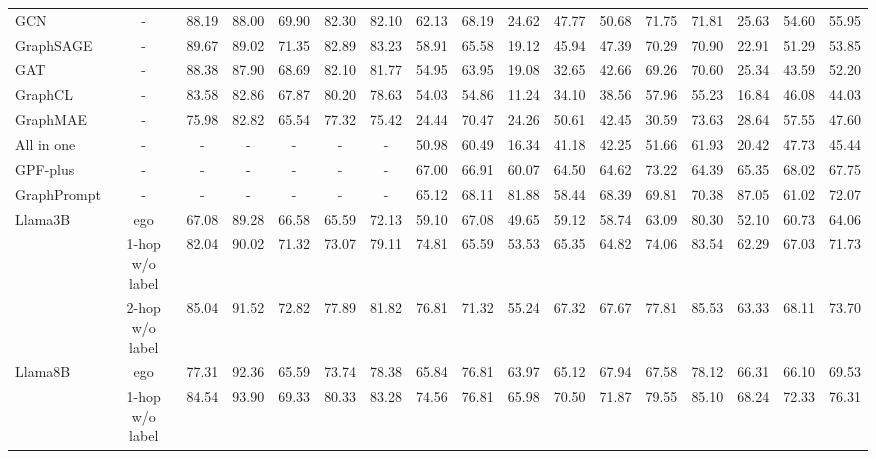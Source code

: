 \begin{table*}[htbp]
{\begin{tabular}{l c c c c c c | c c c c c | c c c c c}
GCN &- & 88.19 & 88.00 & 69.90 & 82.30 \cellcolor{cyan!20} & 82.10 & 62.13 & 68.19 & 24.62 & 47.77 & 50.68 & 71.75 & 71.81 & 25.63 & 54.60 & 55.95 \\
GraphSAGE &- & 89.67 \cellcolor{cyan!100} & 89.02 & 71.35  \cellcolor{cyan!20} & 82.89 \cellcolor{cyan!50} & 83.23 \cellcolor{cyan!20} & 58.91 & 65.58 & 19.12 & 45.94 & 47.39 & 70.29 & 70.90 & 22.91 & 51.29 & 53.85 \\
GAT &- & 88.38 \cellcolor{cyan!20} & 87.90 & 68.69 & 82.10 & 81.77 & 54.95 & 63.95 & 19.08 & 32.65 & 42.66 & 69.26 & 70.60 & 25.34 & 43.59 & 52.20 \\
GraphCL &- & 83.58 & 82.86 & 67.87 & 80.20 & 78.63 & 54.03 & 54.86 & 11.24 & 34.10 & 38.56 & 57.96 & 55.23 & 16.84 & 46.08 & 44.03 \\
GraphMAE &- & 75.98 & 82.82 & 65.54 & 77.32 & 75.42 & 24.44 & 70.47 & 24.26 & 50.61 & 42.45 & 30.59 & 73.63 & 28.64 & 57.55 & 47.60 \\
All in one &- &- &- &- &- &- & 50.98 & 60.49 & 16.34 & 41.18 & 42.25 & 51.66 & 61.93 & 20.42 & 47.73 & 45.44 \\
GPF-plus &- &- &- &- &- &- & 67.00 & 66.91 & 60.07 & 64.50 & 64.62 & 73.22 & 64.39 & 65.35 & 68.02 & 67.75 \\
GraphPrompt &- &- &- &- &- &- & 65.12 & 68.11 & 81.88 \cellcolor{cyan!100} & 58.44 & 68.39 \cellcolor{cyan!20} & 69.81 & 70.38 & 87.05 \cellcolor{cyan!100} & 61.02 & 72.07 \\
\midrule
\multirow{3}{*}{Llama3B} & ego & 67.08 & 89.28 & 66.58 & 65.59 & 72.13 & 59.10 & 67.08 & 49.65 & 59.12 & 58.74 & 63.09 & 80.30 & 52.10 & 60.73 & 64.06 \\
& 1-hop w/o label & 82.04 & 90.02 & 71.32 & 73.07 & 79.11 & 74.81 \cellcolor{cyan!20} & 65.59 & 53.53 & 65.35 & 64.82 & 74.06 & 83.54 & 62.29 & 67.03 & 71.73 \\
& 2-hop w/o label & 85.04 & 91.52 & 72.82 \cellcolor{cyan!50} & 77.89 & 81.82 & 76.81 \cellcolor{cyan!50} & 71.32 & 55.24 & 67.32 \cellcolor{cyan!20} & 67.67 & 77.81 \cellcolor{cyan!20} & 85.53 \cellcolor{cyan!50} & 63.33 & 68.11 \cellcolor{cyan!20} & 73.70 \cellcolor{cyan!20} \\
\midrule
\multirow{3}{*}{Llama8B} & ego & 77.31 & 92.36 \cellcolor{cyan!20} & 65.59 & 73.74 & 78.38 & 65.84 & 76.81 \cellcolor{cyan!50} & 63.97 & 65.12 & 67.94 & 67.58 & 78.12 & 66.31 & 66.10 & 69.53 \\
& 1-hop w/o label & 84.54 & 93.90 \cellcolor{cyan!50} & 69.33 & 80.33 & 83.28 \cellcolor{cyan!50} & 74.56 & 76.81 \cellcolor{cyan!20} & 65.98 \cellcolor{cyan!20} & 70.50 \cellcolor{cyan!50} & 71.87 \cellcolor{cyan!50} & 79.55 \cellcolor{cyan!50} & 85.10 \cellcolor{cyan!20} & 68.24 \cellcolor{cyan!20} & 72.33 \cellcolor{cyan!50} & 76.31 \cellcolor{cyan!50} \\

\end{tabular}}
\end{table*}

